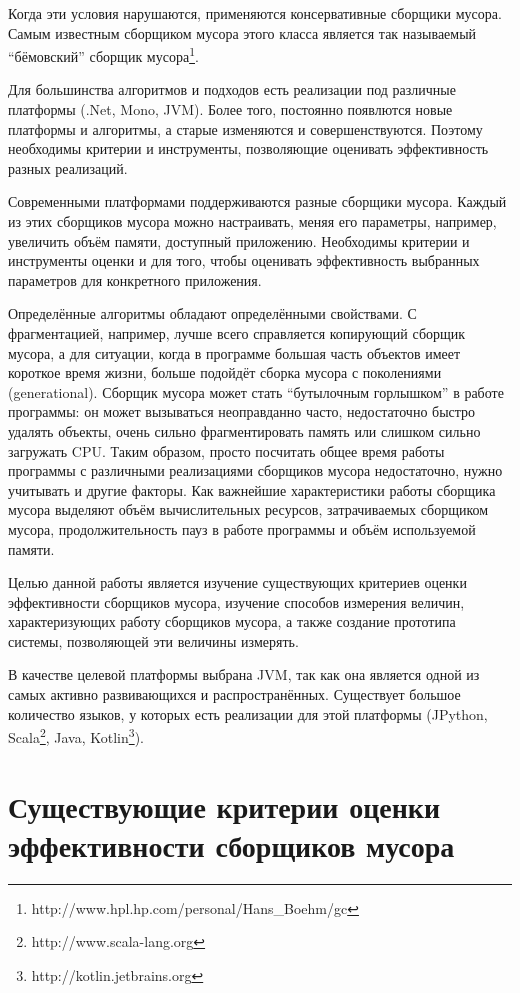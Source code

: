 Когда эти условия нарушаются, применяются консервативные сборщики мусора. Самым известным
сборщиком мусора этого класса является так называемый ``бёмовский''
сборщик мусора\footnote{http://www.hpl.hp.com/personal/Hans\_Boehm/gc}. 

Для большинства алгоритмов и подходов есть реализации под различные платформы (.Net,
Mono, JVM). Более того, постоянно появлются новые платформы и алгоритмы, а старые 
изменяются и совершенствуются. Поэтому необходимы критерии
и инструменты, позволяющие оценивать эффективность разных реализаций.

Современными платформами поддерживаются разные сборщики мусора. Каждый из этих сборщиков мусора можно 
настраивать, меняя его параметры, например, увеличить объём памяти, доступный приложению. 
Необходимы критерии и инструменты оценки и для того, чтобы оценивать
эффективность выбранных параметров для конкретного приложения. 

Определённые алгоритмы обладают определёнными свойствами. С фрагментацией, например, лучше всего 
справляется копирующий сборщик мусора, а для ситуации, когда в программе большая
часть объектов имеет короткое время жизни, больше подойдёт сборка мусора с поколениями (generational).
Сборщик мусора может стать ``бутылочным горлышком'' в работе программы: он может вызываться
неоправданно часто, недостаточно быстро удалять объекты, очень сильно фрагментировать 
память или слишком сильно загружать CPU. Таким образом, просто посчитать общее время 
работы программы с различными реализациями сборщиков мусора недостаточно, нужно 
учитывать и другие факторы. Как важнейшие характеристики работы сборщика мусора выделяют
объём вычислительных ресурсов, затрачиваемых сборщиком мусора, продолжительность
пауз в работе программы и объём используемой памяти.

Целью данной работы является изучение существующих критериев оценки эффективности сборщиков 
мусора, изучение способов измерения величин, характеризующих работу сборщиков мусора,
а также создание прототипа системы, позволяющей эти величины измерять. 

В качестве целевой платформы выбрана JVM, так как она является одной из самых активно 
развивающихся и распространённых. Существует большое количество языков, у которых 
есть реализации для этой платформы (JPython, Scala\footnote{http://www.scala-lang.org},
Java, Kotlin\footnote{http://kotlin.jetbrains.org}).

\section{Существующие критерии оценки эффективности сборщиков мусора}

